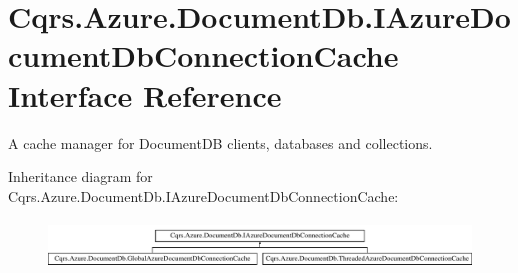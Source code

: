 \hypertarget{interfaceCqrs_1_1Azure_1_1DocumentDb_1_1IAzureDocumentDbConnectionCache}{}\section{Cqrs.\+Azure.\+Document\+Db.\+I\+Azure\+Document\+Db\+Connection\+Cache Interface Reference}
\label{interfaceCqrs_1_1Azure_1_1DocumentDb_1_1IAzureDocumentDbConnectionCache}


A cache manager for Document\+DB clients, databases and collections.  


Inheritance diagram for Cqrs.\+Azure.\+Document\+Db.\+I\+Azure\+Document\+Db\+Connection\+Cache\+:\begin{figure}[H]
\begin{center}
\leavevmode
\includegraphics[height=1.317647cm]{interfaceCqrs_1_1Azure_1_1DocumentDb_1_1IAzureDocumentDbConnectionCache}
\end{center}
\end{figure}
